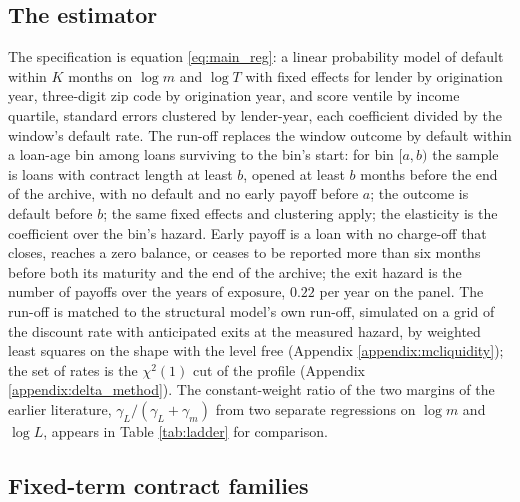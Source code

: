 \documentclass[12pt,english]{article}
\begin{document}
\subsection{The estimator}

The specification is equation \eqref{eq:main_reg}: a linear probability model of default within $K$ months on $\log m$ and $\log T$ with fixed effects for lender by origination year, three-digit zip code by origination year, and score ventile by income quartile, standard errors clustered by lender-year, each coefficient divided by the window's default rate. The run-off replaces the window outcome by default within a loan-age bin among loans surviving to the bin's start: for bin $[a, b)$ the sample is loans with contract length at least $b$, opened at least $b$ months before the end of the archive, with no default and no early payoff before $a$; the outcome is default before $b$; the same fixed effects and clustering apply; the elasticity is the coefficient over the bin's hazard. Early payoff is a loan with no charge-off that closes, reaches a zero balance, or ceases to be reported more than six months before both its maturity and the end of the archive; the exit hazard is the number of payoffs over the years of exposure, $0.22$ per year on the panel. The run-off is matched to the structural model's own run-off, simulated on a grid of the discount rate with anticipated exits at the measured hazard, by weighted least squares on the shape with the level free (Appendix \ref{appendix:mcliquidity}); the set of rates is the $\chi^2(1)$ cut of the profile (Appendix \ref{appendix:delta_method}). The constant-weight ratio of the two margins of the earlier literature, $\gamma_L/(\gamma_L+\gamma_m)$ from two separate regressions on $\log m$ and $\log L$, appears in Table \ref{tab:ladder} for comparison.

\subsection{Fixed-term contract families}
\end{document}
